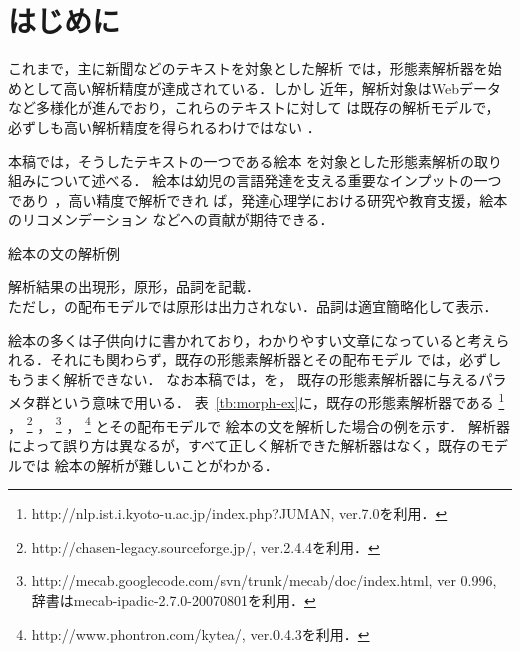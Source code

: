\documentclass[japanese]{jnlp_1.4}
\newcommand{\mecab}{}
\newcommand{\kytea}{}
\newcommand{\chasen}{}
\newcommand{\juman}{}
\newcommand{\pos}[1]{}
\begin{document}
\maketitle

\section{はじめに} \label{sec:introduction}

これまで，主に新聞などのテキストを対象とした解析
では，形態素解析器を始めとして高い解析精度が達成されている．しかし
近年，解析対象はWebデータなど多様化が進んでおり，これらのテキストに対して
は既存の解析モデルで，必ずしも高い解析精度を得られるわけではない
\cite{Kudo:Ichikawa:Talbot:Kazawa:2012j,Katsuki:Sasano:Kawahara:Kurohashi:2011j}．

本稿では，そうしたテキストの一つである絵本
を対象とした形態素解析の取り組みについて述べる．
絵本は幼児の言語発達を支える重要なインプットの一つであり
\cite{Mother-child:Ehon:2006}，高い精度で解析できれ
ば，発達心理学における研究や教育支援，絵本のリコメンデーション\cite{Hattori:Aoyama:2013j}
などへの貢献が期待できる．

\begin{table}[b]
\caption{絵本の文の解析例}\label{tb:morph-ex}

\par\vspace{4pt}
\small
解析結果の出現形，原形，品詞を記載．\\
ただし，\kytea の配布モデルでは原形は出力されない．品詞は適宜簡略化して表示．
\par
\end{table}

絵本の多くは子供向けに書かれており，わかりやすい文章になっていると考えら
れる．それにも関わらず，既存の形態素解析器とその配布モデル
では，必ずしもうまく解析できない．
なお本稿では，\pos{モデル}を，
既存の形態素解析器に与えるパラメタ群という意味で用いる．
表~\ref{tb:morph-ex}に，既存の形態素解析器である
\juman\footnote{http://nlp.ist.i.kyoto-u.ac.jp/index.php?JUMAN, ver.7.0を利用．} \cite{juman:7.0j}， 
\chasen\footnote{http://chasen-legacy.sourceforge.jp/, ver.2.4.4を利用．} \cite{chasen:2.4.4j}，
\mecab\footnote{http://mecab.googlecode.com/svn/trunk/mecab/doc/index.html, 
ver 0.996, 辞書はmecab-ipadic-2.7.0-20070801を利用．} \cite{Mecab}，
\kytea\footnote{http://www.phontron.com/kytea/, ver.0.4.3を利用．}
\cite{Mori:Nakata:Graham:Kawahara:2011j}
とその配布モデルで
絵本の文を解析した場合の例を示す．
解析器によって誤り方は異なるが，すべて正しく解析できた解析器はなく，既存のモデルでは
絵本の解析が難しいことがわかる．
\end{document}
